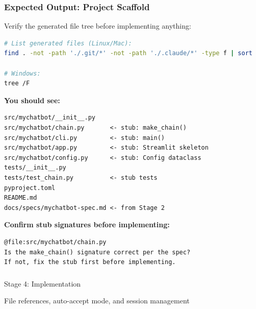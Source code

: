 \begin{frame}[fragile]\frametitle{Expected Output: Project Scaffold}
Verify the generated file tree before implementing anything:

\begin{lstlisting}[language=bash]
# List generated files (Linux/Mac):
find . -not -path './.git/*' -not -path './.claude/*' -type f | sort

# Windows:
tree /F
\end{lstlisting}

\textbf{You should see:}
\begin{lstlisting}
src/mychatbot/__init__.py
src/mychatbot/chain.py       <- stub: make_chain()
src/mychatbot/cli.py         <- stub: main()
src/mychatbot/app.py         <- stub: Streamlit skeleton
src/mychatbot/config.py      <- stub: Config dataclass
tests/__init__.py
tests/test_chain.py          <- stub tests
pyproject.toml
README.md
docs/specs/mychatbot-spec.md <- from Stage 2
\end{lstlisting}

\textbf{Confirm stub signatures before implementing:}
\begin{lstlisting}
@file:src/mychatbot/chain.py
Is the make_chain() signature correct per the spec?
If not, fix the stub first before implementing.
\end{lstlisting}
\end{frame}


\begin{frame}[fragile]\frametitle{}
\begin{center}
{\Large Stage 4: Implementation}

{\normalsize File references, auto-accept mode, and session management}
\end{center}
\end{frame}


